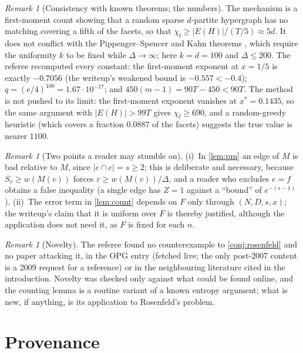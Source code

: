 \documentclass[11pt,a4paper]{article}
\theoremstyle{plain}
\theoremstyle{definition}
\theoremstyle{remark}
\newtheorem{remark}[theorem]{Remark}
\newcommand{\chif}{\chi_{\mathrm{f}}}
\begin{document}
\begin{remark}[Consistency with known theorems; the numbers]\label{rem:consistency}
The mechanism is a first-moment count showing that a random sparse $d$-partite hypergraph has no matching covering a fifth of the facets, so that $\chif\ge|E(H)|/(T/5)\approx5d$. It does not conflict with the Pippenger--Spencer and Kahn theorems \cite{PS89,Kahn96}, which require the uniformity $k$ to be fixed while $\Delta\to\infty$; here $k=d=100$ and $\Delta\le200$. The referee recomputed every constant: the first-moment exponent at $x=1/5$ is exactly $-0.7056$ (the writeup's weakened bound is $-0.557<-0.4$); $q=(e/4)^{100}=1.67\cdot10^{-17}$; and $450(m-1)=90T-450<90T$. The method is not pushed to its limit: the first-moment exponent vanishes at $x^{\ast}=0.1435$, so the same argument with $|E(H)|>99T$ gives $\chif\ge690$, and a random-greedy heuristic (which covers a fraction $0.0887$ of the facets) suggests the true value is nearer $1100$.
\end{remark}

\begin{remark}[Two points a reader may stumble on]\label{rem:bad}
(i)~In \cref{lem:pm} an edge of $M$ is bad relative to $M$, since $|e\cap e|=s\ge2$; this is deliberate and necessary, because $S_v\ge w(M(v))$ forces $\varepsilon\ge w(M(v))/\Delta$, and a reader who excludes $e=f$ obtains a false inequality (a single edge has $Z=1$ against a ``bound'' of $e^{-(s-1)}$). (ii)~The error term in \cref{lem:count} depends on $F$ only through $(N,D,s,x)$; the writeup's claim that it is uniform over $F$ is thereby justified, although the application does not need it, as $F$ is fixed for each $n$.
\end{remark}

\begin{remark}[Novelty]\label{rem:novelty}
The referee found no counterexample to \cref{conj:rosenfeld} and no paper attacking it, in the OPG entry (fetched live; the only post-2007 content is a 2009 request for a reference) or in the neighbouring literature cited in the introduction. Novelty was checked only against what could be found online, and the counting lemma is a routine variant of a known entropy argument; what is new, if anything, is its application to Rosenfeld's problem.
\end{remark}

\section{Provenance}\label{sec:provenance}
\end{document}

